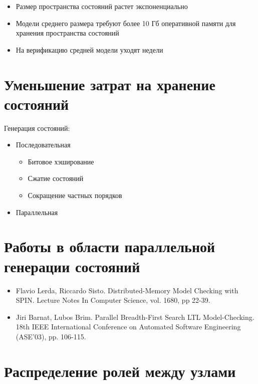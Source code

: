 \documentclass[12pt]{article}
\begin{document}
\begin{itemize}
\item Размер пространства состояний растет экспоненциально

\item Модели среднего размера требуют более 10 Гб оперативной памяти для хранения пространства состояний

\item На верификацию средней модели уходят недели
\end{itemize}

\section{Уменьшение затрат на хранение состояний}
\label{sec:ram-lightening}

Генерация состояний:

\begin{itemize}
\item Последовательная
  \begin{itemize}
  \item Битовое хэширование
  \item Сжатие состояний
  \item Сокращение частных порядков
  \end{itemize}
\item Параллельная
\end{itemize}

\section{Работы в области параллельной генерации состояний}
\label{sec:analogues}

\begin{itemize}
\item Flavio Lerda, Riccardo Sisto. Distributed-Memory Model Checking with SPIN. Lecture
  Notes In Computer Science, vol. 1680, pp 22-39.

\item Jiri Barnat, Lubos Brim. Parallel Breadth-First Search LTL Model-Checking. 18th IEEE
  International Conference on Automated Software Engineering (ASE'03), pp. 106-115.
\end{itemize}

\section{Распределение ролей между узлами}
\label{sec:par-gen}
\end{document}
